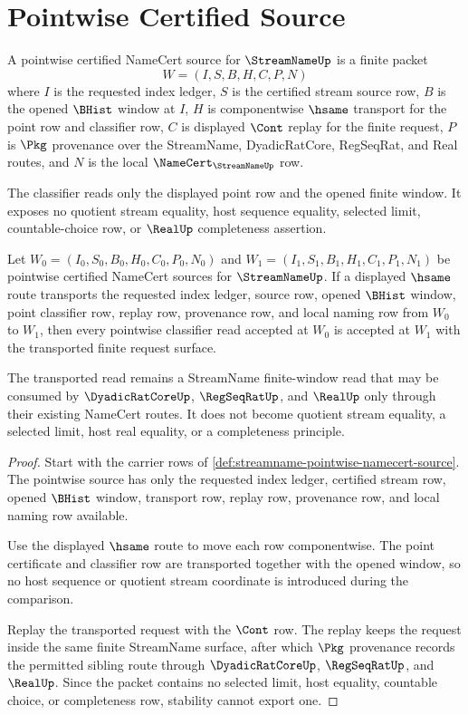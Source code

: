 \section{Pointwise Certified Source}
\label{sec:streamname-pointwise-certified-source}

\begin{definition}
\label{def:streamname-pointwise-namecert-source}
A pointwise certified NameCert source for $\StreamNameUp$ is a finite packet
$$
W=(I,S,B,H,C,P,N)
$$
where $I$ is the requested index ledger, $S$ is the certified stream source row, $B$ is the opened $\BHist$ window at $I$, $H$ is componentwise $\hsame$ transport for the point row and classifier row, $C$ is displayed $\Cont$ replay for the finite request, $P$ is $\Pkg$ provenance over the StreamName, DyadicRatCore, RegSeqRat, and Real routes, and $N$ is the local $\NameCert_{\StreamNameUp}$ row.

The classifier reads only the displayed point row and the opened finite window. It exposes no quotient stream equality, host sequence equality, selected limit, countable-choice row, or $\RealUp$ completeness assertion.
\end{definition}

\begin{theorem}
\label{thm:streamname-pointwise-classifier-stability}
Let $W_0=(I_0,S_0,B_0,H_0,C_0,P_0,N_0)$ and $W_1=(I_1,S_1,B_1,H_1,C_1,P_1,N_1)$ be pointwise certified NameCert sources for $\StreamNameUp$. If a displayed $\hsame$ route transports the requested index ledger, source row, opened $\BHist$ window, point classifier row, replay row, provenance row, and local naming row from $W_0$ to $W_1$, then every pointwise classifier read accepted at $W_0$ is accepted at $W_1$ with the transported finite request surface.

The transported read remains a StreamName finite-window read that may be consumed by $\DyadicRatCoreUp$, $\RegSeqRatUp$, and $\RealUp$ only through their existing NameCert routes. It does not become quotient stream equality, a selected limit, host real equality, or a completeness principle.
\end{theorem}
\begin{proof}
Start with the carrier rows of \autoref{def:streamname-pointwise-namecert-source}. The pointwise source has only the requested index ledger, certified stream row, opened $\BHist$ window, transport row, replay row, provenance row, and local naming row available.

Use the displayed $\hsame$ route to move each row componentwise. The point certificate and classifier row are transported together with the opened window, so no host sequence or quotient stream coordinate is introduced during the comparison.

Replay the transported request with the $\Cont$ row. The replay keeps the request inside the same finite StreamName surface, after which $\Pkg$ provenance records the permitted sibling route through $\DyadicRatCoreUp$, $\RegSeqRatUp$, and $\RealUp$. Since the packet contains no selected limit, host equality, countable choice, or completeness row, stability cannot export one.
\end{proof}

